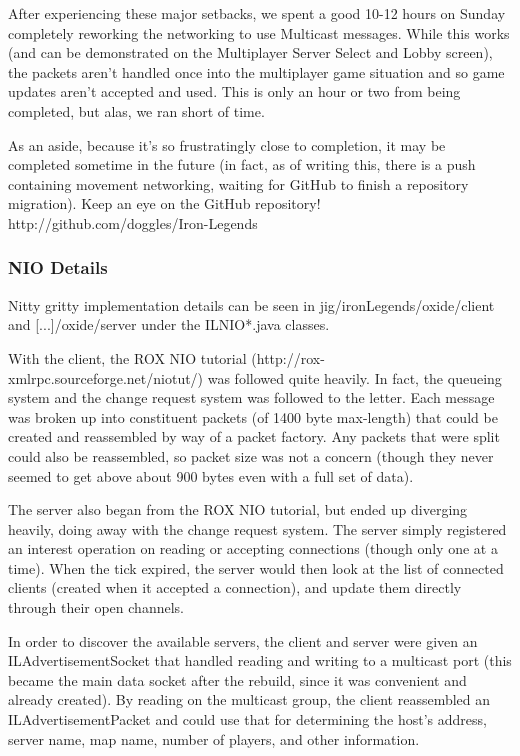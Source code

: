 \documentclass[letterpaper,11pt,twoside]{article}
\begin{document}
After experiencing these major setbacks, we spent a good 10-12 hours on Sunday completely reworking the networking to use Multicast messages. While this works (and can be demonstrated on the Multiplayer Server Select and Lobby screen), the packets aren't handled once into the multiplayer game situation and so game updates aren't accepted and used. This is only an hour or two from being completed, but alas, we ran short of time.

As an aside, because it's so frustratingly close to completion, it may be completed sometime in the future (in fact, as of writing this, there is a push containing movement networking, waiting for GitHub to finish a repository migration). Keep an eye on the GitHub repository! http://github.com/doggles/Iron-Legends

\subsubsection{NIO Details}
Nitty gritty implementation details can be seen in jig/ironLegends/oxide/client and [...]/oxide/server under the ILNIO{*}.java classes.

With the client, the ROX NIO tutorial (http://rox-xmlrpc.sourceforge.net/niotut/) was followed quite heavily. In fact, the queueing system and the change request system was followed to the letter. Each message was broken up into constituent packets (of 1400 byte max-length) that could be created and reassembled by way of a packet factory. Any packets that were split could also be reassembled, so packet size was not a concern (though they never seemed to get above about 900 bytes even with a full set of data).

The server also began from the ROX NIO tutorial, but ended up diverging heavily, doing away with the change request system. The server simply registered an interest operation on reading or accepting connections (though only one at a time). When the tick expired, the server would then look at the list of connected clients (created when it accepted a connection), and update them directly through their open channels.

In order to discover the available servers, the client and server were given an ILAdvertisementSocket that handled reading and writing to a multicast port (this became the main data socket after the rebuild, since it was convenient and already created). By reading on the multicast group, the client reassembled an ILAdvertisementPacket and could use that for determining the host's address, server name, map name, number of players, and other information.
\end{document}
